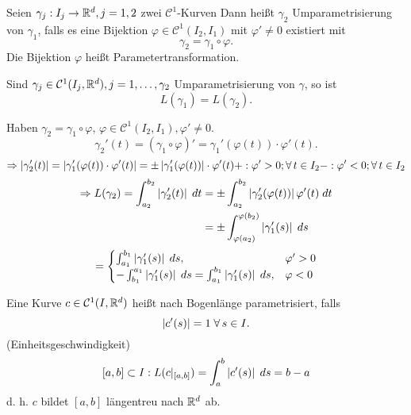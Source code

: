 \documentclass[../ana2.tex]{subfiles}
\begin{document}
\begin{defi}[Umparametrisierung]
    Seien \(\abb{\gamma_j}{I_j}{\R^d}, j=1,2 \) zwei \(\mathcal{C}^1\)-Kurven
    Dann heißt \(\gamma_2\) Umparametrisierung von \( \gamma_1 \),
    falls es eine Bijektion \(\varphi \in \mathcal{C}^1(I_2, I_1)\)
    mit \(\varphi' \neq 0 \) existiert mit 
    \[ \gamma_2 = \gamma_1 \circ \varphi. \]
    Die Bijektion \( \varphi \) heißt Parametertransformation.
\end{defi}
\begin{lem}
    Sind \(\gamma_j \in \mathcal{C}^1(I_j, \R^d), j = 1,\ldots, \gamma_2\) Umparametrisierung  
    von \( \gamma \), so ist 
    \[ L(\gamma_1) = L(\gamma_2). \]
\end{lem}
\begin{bew}
    Haben \( \gamma_2 = \gamma_1 \circ \varphi \), \( \varphi \in \mathcal{C}^1(I_2, I_1), 
    \varphi' \neq 0 \).
    \[ \gamma_2'(t) = (\gamma_1 \circ \varphi)' 
    = \gamma_1'(\varphi(t)) \cdot \varphi'(t). \]
    \[ \Rightarrow \abs{\gamma_2'(t)} 
    = \abs{\gamma'_1(\varphi(t)) \cdot \varphi'(t)} 
    = \pm \abs{\gamma'_1(\varphi(t))} \cdot \varphi'(t) \\
    +: \varphi'> 0;\forall t \in I_2 \\
    -: \varphi'< 0;\forall t \in I_2 \]
    \begin{align*}
        \Rightarrow L(\gamma_2) = \integralx{\abs{ \gamma_2'(t) }}{a_2}{b_2}{t}
        &= \pm \integralx{\abs{\gamma_2'(\varphi(t))} \varphi'(t) }{a_2}{b_2}{t} \\
        &= \pm \integralx{\abs{\gamma_1'(s)}}{\varphi(a_2)}{\varphi(b_2)}{s}
    \end{align*}
    \[ = \begin{cases}
        \integralx{\abs{ \gamma_1'(s) }}{a_1}{b_1}{s}, & \varphi' > 0 \\
        - \integralx{\abs{\gamma_1'(s)}}{b_1}{a_1}{s} 
        = \integralx{\abs{\gamma_1'(s)}}{a_1}{b_1}{s}, & \varphi < 0 
    \end{cases}\]
\end{bew}
\begin{defi}
    Eine Kurve \(c \in \mathcal{C}^1(I, \R^d)\) heißt nach Bogenlänge
    parametrisiert, falls
    \[ \abs{c'(s)} = 1 \; \forall s \in I. \]
    (Einheitsgeschwindigkeit)
    \[ [a,b] \subset I: L(c \vert_{[a,b]}) = \integralx{\abs{c'(s)}}{a}{b}{s}
    = b - a \]
    d. h. \(c\) bildet \([a,b]\) längentreu nach \(\R^d\) ab.
\end{defi}
\end{document}
